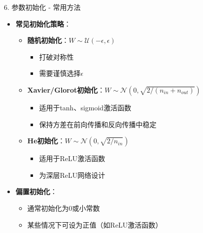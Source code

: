 \documentclass[
  ignorenonframetext,
  aspectratio=169,
  chinese-hans,
]{beamer}
\providecommand{\tightlist}{%
  \setlength{\itemsep}{0pt}\setlength{\parskip}{0pt}}\usepackage{longtable,booktabs,array}
\begin{document}
\begin{frame}{6. 参数初始化 - 常用方法}
\label{ux53c2ux6570ux521dux59cbux5316---ux5e38ux7528ux65b9ux6cd5}
\begin{itemize}
\item
  \textbf{常见初始化策略}：

  \begin{itemize}
  \tightlist
  \item
    \textbf{随机初始化}：\(W \sim \mathcal{U}(-\epsilon, \epsilon)\)

    \begin{itemize}
    \tightlist
    \item
      打破对称性
    \item
      需要谨慎选择\(\epsilon\)
    \end{itemize}
  \item
    \textbf{Xavier/Glorot初始化}：\(W \sim \mathcal{N}(0, \sqrt{2/(n_{in} + n_{out})})\)

    \begin{itemize}
    \tightlist
    \item
      适用于tanh、sigmoid激活函数
    \item
      保持方差在前向传播和反向传播中稳定
    \end{itemize}
  \item
    \textbf{He初始化}：\(W \sim \mathcal{N}(0, \sqrt{2/n_{in}})\)

    \begin{itemize}
    \tightlist
    \item
      适用于ReLU激活函数
    \item
      为深层ReLU网络设计
    \end{itemize}
  \end{itemize}
\item
  \textbf{偏置初始化}：

  \begin{itemize}
  \tightlist
  \item
    通常初始化为0或小常数
  \item
    某些情况下可设为正值（如ReLU激活函数）
  \end{itemize}
\end{itemize}
\end{frame}
\end{document}
